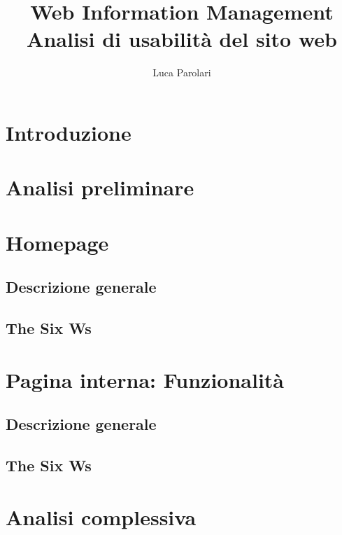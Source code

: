 \documentclass[11pt,a4paper]{article}
\author{Luca Parolari}
\title{Web Information Management\\ \large Analisi di usabilità del sito web \wixcom}
\begin{document}
\maketitle

\clearpage
\tableofcontents

\clearpage

\section{Introduzione}
\label{sec:intro}

\section{Analisi preliminare}
\label{sec:preliminary-analysis}

\section{Homepage}
\label{sec:homepage-analysis}

\subsection{Descrizione generale}
\label{subsec:homepage-description}

\subsection{The Six Ws}
\label{subsec:homepage-the-six-ws}

\section{Pagina interna: Funzionalità}
\label{sec:secondary-page-analysis}

\subsection{Descrizione generale}
\label{subsec:internalpage-description}

\subsection{The Six Ws}
\label{subsec:internalpage-the-six-ws}

\section{Analisi complessiva}
\label{sec:full-analysis}
\end{document}
